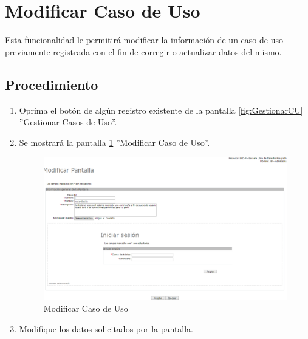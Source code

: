 \hypertarget{cv:modificarCU}{\section{Modificar Caso de Uso}} \label{sec:modificarCU}

	Esta funcionalidad le permitirá modificar la información de un caso de uso previamente registrada con el fin de corregir o actualizar datos del mismo. 

		\subsection{Procedimiento}

			\begin{enumerate}
	
			\item Oprima el botón \IUEditar{} de algún registro existente de la pantalla \ref{fig:GestionarCU} ''Gestionar Casos de Uso''.
	
			\item Se mostrará la pantalla \ref{fig:modificarCU} ''Modificar Caso de Uso''.
			
			\begin{figure}[htbp!]
				\begin{center}
					\includegraphics[scale=0.5]{roles/lider/casosUso/pantallas/IU11-2modificarPantalla}
					\caption{Modificar Caso de Uso}
					\label{fig:modificarCU}
				\end{center}
			\end{figure}
		
			\item Modifique los datos solicitados por la pantalla.
			

\end{enumerate}
